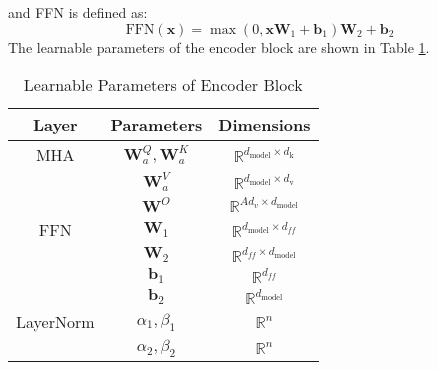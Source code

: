 and FFN is defined as: 
$$\text{FFN}(\mathbf{x}) = \max(0, \mathbf{x} \mathbf{\mathbf{W}}_1 + \mathbf{b}_1) \mathbf{W}_2 + \mathbf{b}_2$$
The learnable parameters of the encoder block are shown in Table \ref{tab:bert-parameters}.

\begingroup
\setlength{\tabcolsep}{10pt} %
\renewcommand{\arraystretch}{1.5} %
\begin{table}[H]
\centering
    \begin{tabular}{c|c|c}
    \textbf{Layer} & \textbf{Parameters} & \textbf{Dimensions} \\ \hline
     MHA & $\mathbf{W}_a^Q, \mathbf{W}_a^K$ & $\mathbb{R}^{d_{\text{model}} \times d_{\text{k}}}$ \\
    
    & $\mathbf{W}_a^V$ & $\mathbb{R}^{d_{\text{model}} \times d_{\text{v}}}$ \\
    
    & $\mathbf{W}^O$ & $\mathbb{R}^{Ad_v \times d_{\text{model}}}$ \\ \hline
     
     FFN & $\mathbf{W}_1$ & $\mathbb{R}^{d_{\text{model}} \times d_{ff}}$ \\
     & $\mathbf{W}_2$ & $\mathbb{R}^{d_{ff} \times d_{\text{model}}}$ \\
     & $\mathbf{b}_1$ & $\mathbb{R}^{d_{ff}}$ \\
     & $\mathbf{b}_2$ & $\mathbb{R}^{d_{\text{model}}}$ \\ \hline
     
    LayerNorm & $\alpha_1, \beta_1$ & $\mathbb{R}^n$ \\
     & $\alpha_2, \beta_2$ & $\mathbb{R}^n$ \\ 
    \end{tabular}
\caption{Learnable Parameters of Encoder Block}
\label{tab:bert-parameters}
\end{table}
\endgroup


